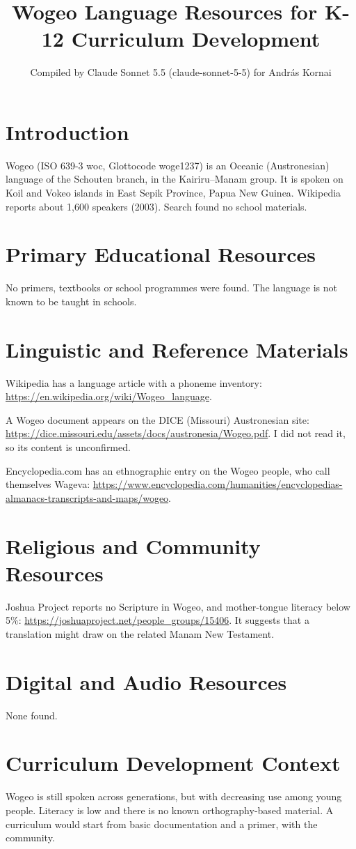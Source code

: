 \documentclass[12pt]{article}
\title{Wogeo Language Resources for K-12 Curriculum Development}
\author{Compiled by Claude Sonnet 5.5 (claude-sonnet-5-5) for Andr\'as Kornai}
\date{}
\begin{document}
\maketitle

\section{Introduction}
Wogeo (ISO 639-3 woc, Glottocode woge1237) is an Oceanic (Austronesian) language of the Schouten branch, in the Kairiru--Manam group. It is spoken on Koil and Vokeo islands in East Sepik Province, Papua New Guinea. Wikipedia reports about 1{,}600 speakers (2003). Search found no school materials.

\section{Primary Educational Resources}
No primers, textbooks or school programmes were found. The language is not known to be taught in schools.

\section{Linguistic and Reference Materials}
Wikipedia has a language article with a phoneme inventory: \url{https://en.wikipedia.org/wiki/Wogeo_language}.

A Wogeo document appears on the DICE (Missouri) Austronesian site: \url{https://dice.missouri.edu/assets/docs/austronesia/Wogeo.pdf}. I did not read it, so its content is unconfirmed.

Encyclopedia.com has an ethnographic entry on the Wogeo people, who call themselves Wageva: \url{https://www.encyclopedia.com/humanities/encyclopedias-almanacs-transcripts-and-maps/wogeo}.

\section{Religious and Community Resources}
Joshua Project reports no Scripture in Wogeo, and mother-tongue literacy below 5\%: \url{https://joshuaproject.net/people_groups/15406}. It suggests that a translation might draw on the related Manam New Testament.

\section{Digital and Audio Resources}
None found.

\section{Curriculum Development Context}
Wogeo is still spoken across generations, but with decreasing use among young people. Literacy is low and there is no known orthography-based material. A curriculum would start from basic documentation and a primer, with the community.
\end{document}
